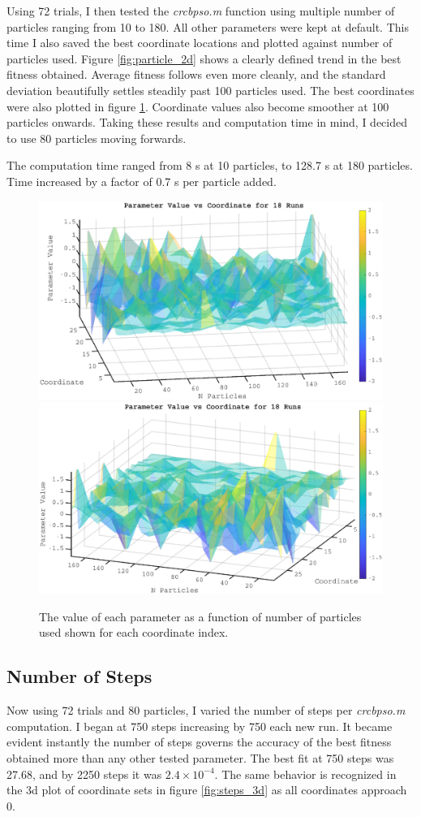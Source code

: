 \documentclass{article}
\begin{document}
Using 72 trials, I then tested the \textit{crcbpso.m} function using multiple number of particles ranging from 10 to 180.
All other parameters were kept at default.
This time I also saved the best coordinate locations and plotted against number of particles used.
Figure \ref{fig:particle_2d} shows a clearly defined trend in the best fitness obtained.
Average fitness follows even more cleanly, and the standard deviation beautifully settles steadily past 100 particles used.
The best coordinates were also plotted in figure \ref{fig:particle_3d}.
Coordinate values also become smoother at 100 particles onwards.
Taking these results and computation time in mind, I decided to use 80 particles moving forwards.

The computation time ranged from 8 s at 10 particles, to 128.7 s at 180 particles.
Time increased by a factor of 0.7 s per particle added.
\pagebreak
\begin{figure}[h!]
\centering
\includegraphics[width=0.65\linewidth]{particle_3d_1}
\includegraphics[width=0.65\linewidth]{particle_3d_2}
\caption{The value of each parameter as a function of number of particles used shown for each coordinate index.}
\label{fig:particle_3d}
\end{figure}

\subsection{Number of Steps}

Now using 72 trials and 80 particles, I varied the number of steps per \textit{crcbpso.m} computation.
I began at 750 steps increasing by 750 each new run.
It became evident instantly the number of steps governs the accuracy of the best fitness obtained more than any other tested parameter.
The best fit at 750 steps was 27.68, and by 2250 steps it was \(2.4\times10^{-4}\).
The same behavior is recognized in the 3d plot of coordinate sets in figure \ref{fig:steps_3d} as all coordinates approach 0.
\end{document}
